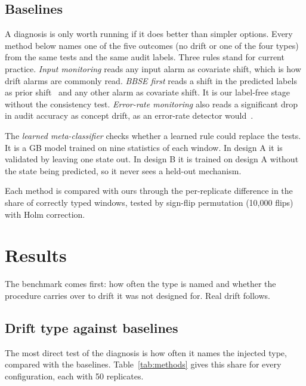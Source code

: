 \documentclass[pdflatex,sn-mathphys-num]{sn-jnl}
\begin{document}
\subsection{Baselines}\label{sec:baselines}

A diagnosis is only worth running if it does better than simpler options. Every method below names one of the five outcomes (no drift or one of the four types) from the same tests and the same audit labels. Three rules stand for current practice. \emph{Input monitoring} reads any input alarm as covariate shift, which is how drift alarms are commonly read. \emph{BBSE first} reads a shift in the predicted labels as prior shift~\cite{lipton2018bbse,rabanser2019failing} and any other alarm as covariate shift. It is our label-free stage without the consistency test. \emph{Error-rate monitoring} also reads a significant drop in audit accuracy as concept drift, as an error-rate detector would~\cite{gama2004ddm}.

The \emph{learned meta-classifier} checks whether a learned rule could replace the tests. It is a GB model trained on nine statistics of each window. In design A it is validated by leaving one state out. In design B it is trained on design A without the state being predicted, so it never sees a held-out mechanism.

Each method is compared with ours through the per-replicate difference in the share of correctly typed windows, tested by sign-flip permutation (10,000 flips) with Holm correction.

\section{Results}\label{sec:results}

The benchmark comes first: how often the type is named and whether the procedure carries over to drift it was not designed for. Real drift follows.

\subsection{Drift type against baselines}\label{sec:res-methods}

The most direct test of the diagnosis is how often it names the injected type, compared with the baselines. Table~\ref{tab:methods} gives this share for every configuration, each with 50 replicates.
\end{document}
